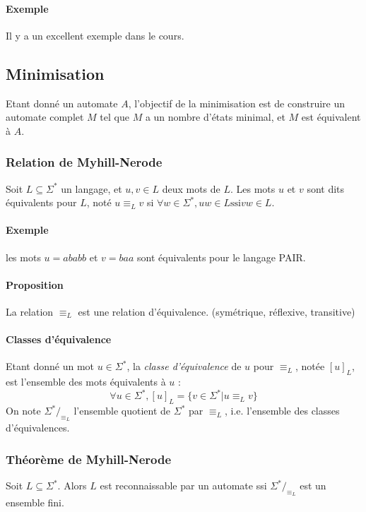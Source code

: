 \documentclass[a4paper]{article}
\begin{document}
  \paragraph{Exemple} Il y a un excellent exemple dans le cours.


  \subsection{Minimisation}
  Etant donné un automate $A$, l'objectif de la minimisation est de construire un automate
  complet $M$ tel que $M$ a un nombre d'états minimal, et $M$ est équivalent à $A$.

  \subsubsection{Relation de Myhill-Nerode}
  Soit $L \subseteq \Sigma^*$ un langage, et $u,v\in L$ deux mots de $L$.
  Les mots $u$ et $v$ sont dits équivalents pour $L$, noté $u \equiv_L v$ si
  $ \forall w \in \Sigma^*, uw \in L \text{ssi} vw \in L$.

  \paragraph{Exemple} les mots $u=ababb$ et $v=baa$ sont équivalents pour le 
  langage PAIR.

  \paragraph{Proposition} La relation $\equiv_L$ est une relation d'équivalence. 
  (symétrique, réflexive, transitive)

  \paragraph{Classes d'équivalence}
  Etant donné un mot $u \in \Sigma^*$, la \textit{classe d'équivalence} de $u$ pour
  $\equiv_L$, notée $[u]_L$, est l'ensemble des mots équivalents à $u$ :
  $$ \forall u \in \Sigma^*, [u]_L = \{v \in \Sigma^* | u \equiv_L v\}$$
  On note $\Sigma^*/_{\equiv_L}$ l'ensemble quotient de $\Sigma^*$ par $\equiv_L$, 
  i.e. l'ensemble des classes d'équivalences.

  \subsubsection{Théorème de Myhill-Nerode}
  Soit $L \subseteq \Sigma^*$. Alors $L$ est reconnaissable par un automate 
  ssi $\Sigma^*/_{\equiv_L}$ est un ensemble fini.
  
\end{document}
